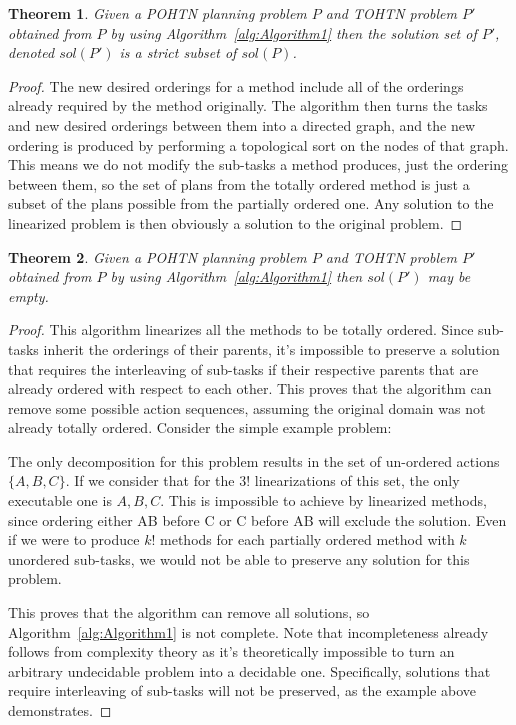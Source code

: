 \documentclass[letterpaper]{article} %
\newtheorem{theorem}{Theorem}
\begin{document}
\begin{theorem}\label{thm:Soundness}
	Given a POHTN planning problem $P$ and TOHTN problem
	$P'$ obtained from $P$ by using Algorithm~\ref{alg:Algorithm1}
	then the solution set of $P'$, denoted $sol(P')$ is a strict subset of $sol(P)$.
\end{theorem}
\begin{proof}
	The new desired orderings for a method include all of the orderings already required by the method originally. The algorithm then turns the tasks and new desired orderings between them into a directed graph, and the new ordering is produced by performing a topological sort on the nodes of that graph. This means we do not modify the sub-tasks a method produces, just the ordering between them, so the set of plans from the totally ordered method is just a subset of the plans possible from the partially ordered one. Any solution to the linearized problem is then obviously a solution to the original problem.
\end{proof}



\begin{theorem}\label{thm:notCompleteness}
	Given a POHTN planning problem $P$ and TOHTN problem
	$P'$ obtained from $P$ by using Algorithm~\ref{alg:Algorithm1}
	then $sol(P')$ may be empty.
\end{theorem}
\begin{proof}
	This algorithm linearizes all the methods to be totally ordered. Since sub-tasks inherit the orderings of their parents, it's impossible to preserve a solution that requires the interleaving of sub-tasks if their respective parents that are already ordered with respect to each other. This proves that the algorithm can remove some possible action sequences, assuming the original domain was not already totally ordered. Consider the simple example problem:
	
	
	The only decomposition for this problem results in the set of un-ordered actions $\{A, B, C\}$.
	If we consider that for the $3!$ linearizations of this set, the only executable one is $A, B, C$. This is impossible to achieve by linearized methods, since ordering either AB before C or C before AB will exclude the solution. 
	Even if we were to produce $k!$ methods for each partially ordered method with $k$ unordered sub-tasks, we would not be able to preserve any solution for this problem.
	
	This proves that the algorithm can remove all solutions, so Algorithm~\ref{alg:Algorithm1} is not complete. Note that incompleteness already follows from complexity theory as it's theoretically impossible to turn an arbitrary undecidable problem into a decidable one.
	Specifically, solutions that require interleaving of sub-tasks will not be preserved, as the example above demonstrates.
\end{proof}
\end{document}
